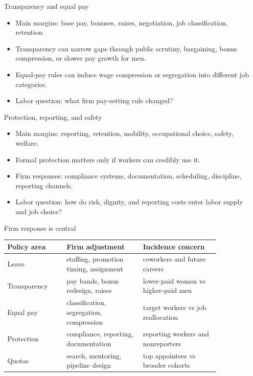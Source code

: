 \documentclass[aspectratio=169,11pt]{beamer}
\begin{document}
\begin{frame}{Transparency and equal pay}
\begin{itemize}
    \item Main margins: base pay, bonuses, raises, negotiation, job classification, retention.
    \item Transparency can narrow gaps through public scrutiny, bargaining, bonus compression, or slower pay growth for men.
    \item Equal-pay rules can induce wage compression or segregation into different job categories.
    \item Labor question: what firm pay-setting rule changed?
\end{itemize}
\end{frame}

\begin{frame}{Protection, reporting, and safety}
\begin{itemize}
    \item Main margins: reporting, retention, mobility, occupational choice, safety, welfare.
    \item Formal protection matters only if workers can credibly use it.
    \item Firm responses: compliance systems, documentation, scheduling, discipline, reporting channels.
    \item Labor question: how do risk, dignity, and reporting costs enter labor supply and job choice?
\end{itemize}
\end{frame}

\begin{frame}{Firm response is central}
\scriptsize
\begin{tabular}{p{0.24\linewidth} p{0.31\linewidth} p{0.31\linewidth}}
\toprule
Policy area & Firm adjustment & Incidence concern \\
\midrule
Leave & staffing, promotion timing, assignment & coworkers and future careers \\
Transparency & pay bands, bonus redesign, raises & lower-paid women vs higher-paid men \\
Equal pay & classification, segregation, compression & target workers vs job reallocation \\
Protection & compliance, reporting, documentation & reporting workers and nonreporters \\
Quotas & search, mentoring, pipeline design & top appointees vs broader cohorts \\
\bottomrule
\end{tabular}
\end{frame}
\end{document}
